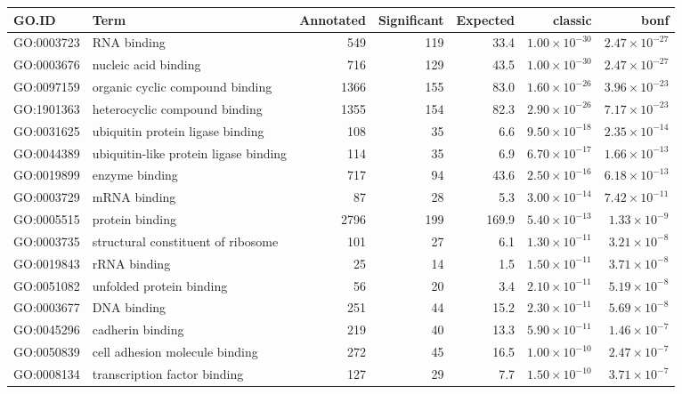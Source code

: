 \begin{table}[ht]
\centering
\begin{tabular}{llrrrrr}
  \hline
GO.ID & Term & Annotated & Significant & Expected & classic & bonf \\ 
  \hline
GO:0003723 & RNA binding & 549 & 119 & 33.4 & $1.00 \times 10^{-30}$ & $2.47 \times 10^{-27}$ \\ 
  GO:0003676 & nucleic acid binding & 716 & 129 & 43.5 & $1.00 \times 10^{-30}$ & $2.47 \times 10^{-27}$ \\ 
  GO:0097159 & organic cyclic compound binding & 1366 & 155 & 83.0 & $1.60 \times 10^{-26}$ & $3.96 \times 10^{-23}$ \\ 
  GO:1901363 & heterocyclic compound binding & 1355 & 154 & 82.3 & $2.90 \times 10^{-26}$ & $7.17 \times 10^{-23}$ \\ 
  GO:0031625 & ubiquitin protein ligase binding & 108 & 35 & 6.6 & $9.50 \times 10^{-18}$ & $2.35 \times 10^{-14}$ \\ 
  GO:0044389 & ubiquitin-like protein ligase binding & 114 & 35 & 6.9 & $6.70 \times 10^{-17}$ & $1.66 \times 10^{-13}$ \\ 
  GO:0019899 & enzyme binding & 717 & 94 & 43.6 & $2.50 \times 10^{-16}$ & $6.18 \times 10^{-13}$ \\ 
  GO:0003729 & mRNA binding & 87 & 28 & 5.3 & $3.00 \times 10^{-14}$ & $7.42 \times 10^{-11}$ \\ 
  GO:0005515 & protein binding & 2796 & 199 & 169.9 & $5.40 \times 10^{-13}$ & $1.33 \times 10^{-9}$ \\ 
  GO:0003735 & structural constituent of ribosome & 101 & 27 & 6.1 & $1.30 \times 10^{-11}$ & $3.21 \times 10^{-8}$ \\ 
  GO:0019843 & rRNA binding & 25 & 14 & 1.5 & $1.50 \times 10^{-11}$ & $3.71 \times 10^{-8}$ \\ 
  GO:0051082 & unfolded protein binding & 56 & 20 & 3.4 & $2.10 \times 10^{-11}$ & $5.19 \times 10^{-8}$ \\ 
  GO:0003677 & DNA binding & 251 & 44 & 15.2 & $2.30 \times 10^{-11}$ & $5.69 \times 10^{-8}$ \\ 
  GO:0045296 & cadherin binding & 219 & 40 & 13.3 & $5.90 \times 10^{-11}$ & $1.46 \times 10^{-7}$ \\ 
  GO:0050839 & cell adhesion molecule binding & 272 & 45 & 16.5 & $1.00 \times 10^{-10}$ & $2.47 \times 10^{-7}$ \\ 
  GO:0008134 & transcription factor binding & 127 & 29 & 7.7 & $1.50 \times 10^{-10}$ & $3.71 \times 10^{-7}$ \\ 

\end{tabular}
\end{table}
